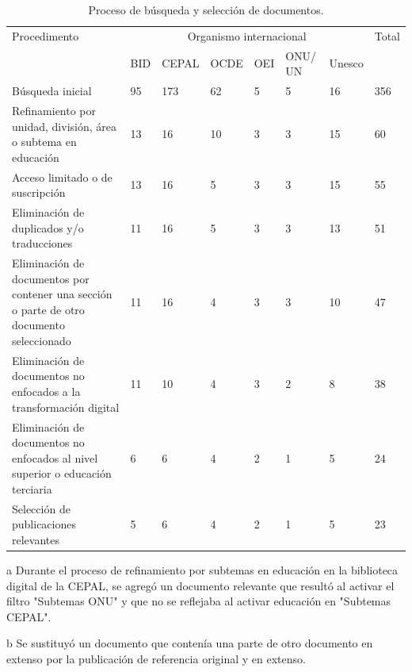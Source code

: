     
    \begin{table}[htpb]
    \centering
    \small
    \begin{threeparttable}
    \caption{Proceso de búsqueda y selección de documentos.}
    \label{tab-04}
    \begin{tabular}{
    >{\raggedright\arraybackslash}p{}
    *{7}{l}
    }
    \toprule
    Procedimento & \multicolumn{6}{c}{Organismo internacional} & Total \\
            & BID & CEPAL & OCDE & OEI & ONU/ UN & Unesco & \\
    \midrule
            Búsqueda inicial & 95 & 173 & 62 & 5 & 5 & 16 & 356 \\
            Refinamiento por unidad, división, área o subtema en educación
            & 13 & 16\tnote{a} & 10 & 3 & 3 & 15 & 60 \\
            Acceso limitado o de suscripción & 13 & 16 & 5 & 3 & 3 & 15 &
            55 \\
            Eliminación de duplicados y/o traducciones & 11 & 16 & 5 & 3 &
            3 & 13 & 51 \\
            Eliminación de documentos por contener una sección o parte de otro documento seleccionado & 11 & 16\tnote{b} & 4 & 3 & 3 & 10 &
            47 \\
            Eliminación de documentos no enfocados a la transformación digital & 11 & 10 & 4 & 3 & 2 & 8 & 38 \\
            Eliminación de documentos no enfocados al nivel superior o educación terciaria & 6 & 6 & 4 & 2 & 1 & 5 & 24 \\
            Selección de publicaciones relevantes & 5 & 6
            & 4 & 2 & 1 & 5 & 23 \\
            \bottomrule
        \end{tabular}
        \begin{tablenotes}
        \small {
        \item[a]{Durante el proceso de refinamiento por subtemas en educación en la biblioteca digital de la CEPAL, se agregó un documento relevante que resultó al activar el filtro "Subtemas ONU" y que no se reflejaba al activar educación en "Subtemas CEPAL".}
        \item[b]{Se sustituyó un documento que contenía una parte de otro documento en extenso por la publicación de referencia original y en extenso.}
        }
        \end{tablenotes}
        \end{threeparttable}
    \end{table}

